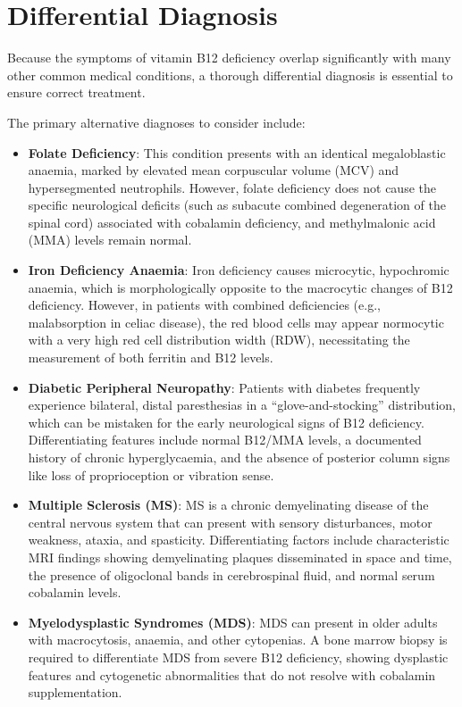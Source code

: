 \section*{Differential Diagnosis}
Because the symptoms of vitamin B12 deficiency overlap significantly with many other common medical conditions, a thorough differential diagnosis is essential to ensure correct treatment.

The primary alternative diagnoses to consider include:
\begin{itemize}
    \item \textbf{Folate Deficiency}: This condition presents with an identical megaloblastic anaemia, marked by elevated mean corpuscular volume (MCV) and hypersegmented neutrophils. However, folate deficiency does not cause the specific neurological deficits (such as subacute combined degeneration of the spinal cord) associated with cobalamin deficiency, and methylmalonic acid (MMA) levels remain normal.
    \item \textbf{Iron Deficiency Anaemia}: Iron deficiency causes microcytic, hypochromic anaemia, which is morphologically opposite to the macrocytic changes of B12 deficiency. However, in patients with combined deficiencies (e.g., malabsorption in celiac disease), the red blood cells may appear normocytic with a very high red cell distribution width (RDW), necessitating the measurement of both ferritin and B12 levels.
    \item \textbf{Diabetic Peripheral Neuropathy}: Patients with diabetes frequently experience bilateral, distal paresthesias in a ``glove-and-stocking'' distribution, which can be mistaken for the early neurological signs of B12 deficiency. Differentiating features include normal B12/MMA levels, a documented history of chronic hyperglycaemia, and the absence of posterior column signs like loss of proprioception or vibration sense.
    \item \textbf{Multiple Sclerosis (MS)}: MS is a chronic demyelinating disease of the central nervous system that can present with sensory disturbances, motor weakness, ataxia, and spasticity. Differentiating factors include characteristic MRI findings showing demyelinating plaques disseminated in space and time, the presence of oligoclonal bands in cerebrospinal fluid, and normal serum cobalamin levels.
    \item \textbf{Myelodysplastic Syndromes (MDS)}: MDS can present in older adults with macrocytosis, anaemia, and other cytopenias. A bone marrow biopsy is required to differentiate MDS from severe B12 deficiency, showing dysplastic features and cytogenetic abnormalities that do not resolve with cobalamin supplementation.

\end{itemize}
